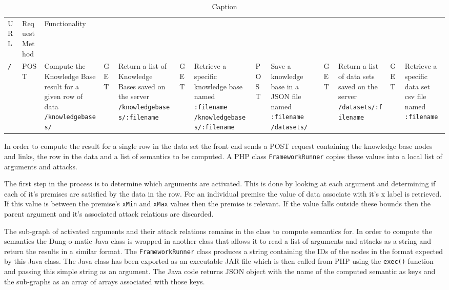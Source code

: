 \begin{table}[]
\centering
\begin{tabular}{|l|l|L{5cm}|}
 URL & Request Method & Functionality \hline \\
 \lstinline{/} & POST & Compute the Knowledge Base result for a given row of data
 \lstinline{/knowledgebases/} & GET & Return a list of Knowledge Bases saved on the server
 \lstinline{/knowledgebases/:filename} & GET & Retrieve a specific knowledge base named \lstinline{:filename}
 \lstinline{/knowledgebases/:filename} & POST & Save a knowledge base in a JSON file named \lstinline{:filename}
 \lstinline{/datasets/} & GET & Return a list of data sets saved on the server
 \lstinline{/datasets/:filename} & GET & Retrieve a specific data set csv file named \lstinline{:filename}
\end{tabular}
\caption{Caption}
\label{tab:rest_routes}
\end{table}

In order to compute the result for a single row in the data set the front end sends a POST request containing the knowledge base nodes and links, the row in the data and a list of semantics to be computed. A PHP class \lstinline{FrameworkRunner} copies these values into a local list of arguments and attacks.

The first step in the process is to determine which arguments are activated. This is done by looking at each argument and determining if each of it's premises are satisfied by the data in the row. For an individual premise the value of data associate with it's x label is retrieved. If this value is between the premise's \lstinline{xMin} and \lstinline{xMax} values then the premise is relevant. If the value falls outside these bounds then the parent argument and it's associated attack relations are discarded. 

The sub-graph of activated arguments and their attack relations remains in the class to compute semantics for. In order to compute the semantics the Dung-o-matic Java class is wrapped in another class that allows it to read a list of arguments and attacks as a string and return the results in a similar format. The \lstinline{FrameworkRunner} class produces a string containing the IDs of the nodes in the format expected by this Java class. The Java class has been exported as an executable JAR file which is then called from PHP using the \lstinline{exec()} function and passing this simple string as an argument. The Java code returns JSON object with the name of the computed semantic as keys and the sub-graphs as an array of arrays associated with those keys.

